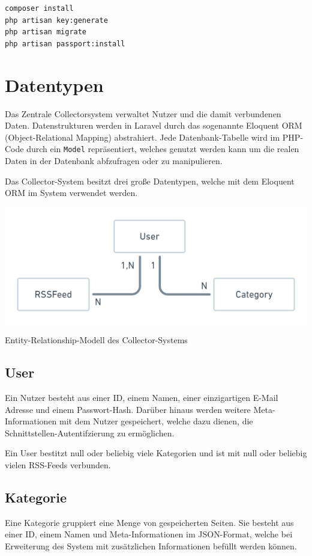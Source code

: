         
        \begin{lstlisting}[caption={Installationsprozess mit Artisan und Composer}]
composer install
php artisan key:generate
php artisan migrate
php artisan passport:install
        \end{lstlisting}

\section{Datentypen}
    Das Zentrale Collectorsystem verwaltet Nutzer und die damit verbundenen Daten.
    Datenstrukturen werden in Laravel durch das sogenannte Eloquent ORM (Object-Relational Mapping) abstrahiert. Jede Datenbank-Tabelle wird im PHP-Code durch ein \texttt{Model} repräsentiert, welches genutzt werden kann um die realen Daten in der Datenbank abfzufragen oder zu manipulieren.
    
    Das Collector-System besitzt drei große Datentypen, welche mit dem Eloquent ORM im System verwendet werden.
    
    \begin{center}
        \includegraphics[width=\textwidth]{images/collector-erm.png}
        \caption{Entity-Relationship-Modell des Collector-Systems}
    \end{center}
    
    \subsection{User}
        Ein Nutzer besteht aus einer ID, einem Namen, einer einzigartigen E-Mail Adresse und einem Passwort-Hash. Darüber hinaus werden weitere Meta-Informationen mit dem Nutzer gespeichert, welche dazu dienen, die Schnittstellen-Autentifzierung zu ermöglichen.
        
        Ein User bestitzt null oder beliebig viele Kategorien und ist mit null oder beliebig vielen RSS-Feeds verbunden.
    \subsection{Kategorie}
        Eine Kategorie gruppiert eine Menge von gespeicherten Seiten. Sie besteht aus einer ID, einem Namen und Meta-Informationen im JSON-Format, welche bei Erweiterung des System mit zusätzlichen Informationen befüllt werden können.
        
